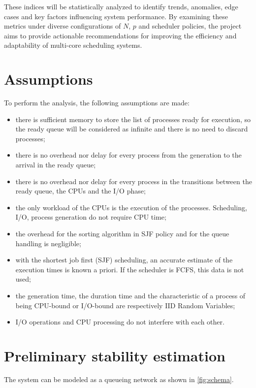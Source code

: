 These indices will be statistically analyzed to identify trends, anomalies, edge cases and key factors influencing system performance. By examining these metrics under diverse configurations of \( N \), \( p \) and scheduler policies, the project aims to provide actionable recommendations for improving the efficiency and adaptability of multi-core scheduling systems.

\section{Assumptions}
To perform the analysis, the following assumptions are made:
\begin{itemize}
    \item there is sufficient memory to store the list of processes ready for execution, so the ready queue will be considered as infinite and there is no need to discard processes;
    \item there is no overhead nor delay for every process from the generation to the arrival in the ready queue;
    \item there is no overhead nor delay for every process in the transitions between the ready queue, the CPUs and the I/O phase;
    \item the only workload of the CPUs is the execution of the processes. Scheduling, I/O, process generation do not require CPU time;
    \item the overhead for the sorting algorithm in SJF policy and for the queue handling is negligible;
    \item with the shortest job first (SJF) scheduling, an accurate estimate of the execution times is known a priori. If the scheduler is FCFS, this data is not used;
    \item the generation time, the duration time and the characteristic of a process of being CPU-bound or I/O-bound are respectively IID Random Variables;
    \item I/O operations and CPU processing do not interfere with each other.
\end{itemize}




\section{Preliminary stability estimation}

The system can be modeled as a queueing network as shown in \autoref{fig:schema}.


